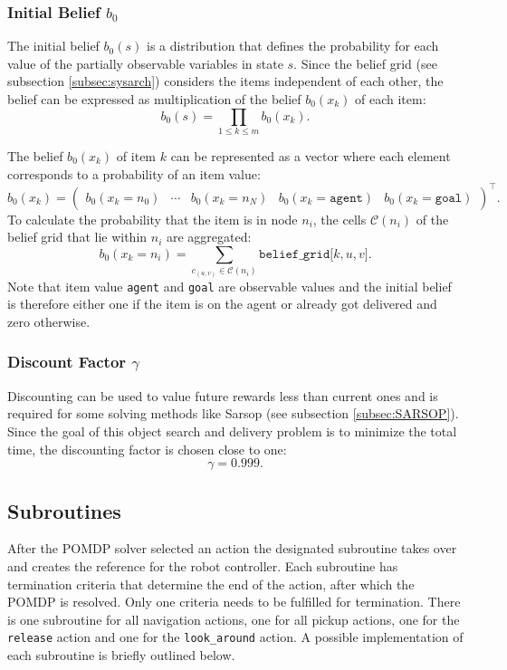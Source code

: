 \subsubsection{Initial Belief $b_0$}
The initial belief $b_0(s)$ is a distribution that defines the probability for each value of the partially observable variables in state $s$. Since the belief grid (see subsection \ref{subsec:sysarch}) considers the items independent of each other, the belief can be expressed as multiplication of the belief $b_0(x_k)$ of each item:
\begin{equation}
    b_0(s) = \prod_{1\leq k \leq m} b_0(x_k).
\end{equation}

The belief $b_0(x_k)$ of item $k$ can be represented as a vector where each element corresponds to a probability of an item value:
\begin{equation}
    b_0(x_k) = \begin{pmatrix} b_0(x_k=n_0) & \cdots & b_0(x_k=n_N) & b_0(x_k=\texttt{agent}) & b_0(x_k=\texttt{goal}) \end{pmatrix}^\intercal.
\end{equation}
To calculate the probability that the item is in node $n_i$, the cells $\mathcal{C}(n_i)$ of the belief grid that lie within $n_i$ are aggregated:
\begin{equation}
b_0\left(x_k=n_i\right) = \sum_{c_{(u,v)}\in \mathcal{C}(n_i)}\texttt{belief\_grid[$k, u, v$]}.
\end{equation}
Note that item value \texttt{agent} and \texttt{goal} are observable values and the initial belief is therefore either one if the item is on the agent or already got delivered and zero otherwise. 
\subsubsection{Discount Factor $\gamma$}
Discounting can be used to value future rewards less than current ones and is required for some solving methods like Sarsop (see subsection \ref{subsec:SARSOP}). Since the goal of this object search and delivery problem is to minimize the total time, the discounting factor is chosen close to one:
\begin{equation}
    \gamma = 0.999.
\end{equation}
\subsection{Subroutines}\label{subsec:subroutine}
After the POMDP solver selected an action the designated subroutine takes over and creates the reference for the robot controller. Each subroutine has termination criteria that determine the end of the action, after which the POMDP is resolved. Only one criteria needs to be fulfilled for termination. There is one subroutine for all navigation actions, one for all pickup actions, one for the \texttt{release} action and one for the \texttt{look\_around} action. A possible implementation of each subroutine is briefly outlined below.\\

